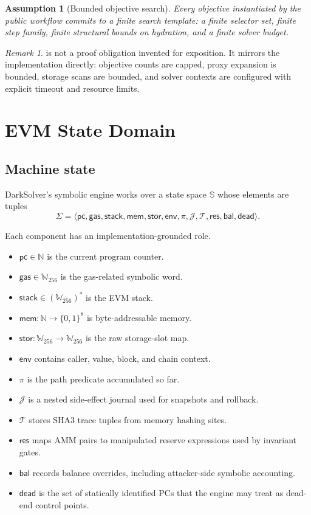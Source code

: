 \documentclass[11pt]{article}
\numberwithin{equation}{section}
\newtheorem{assumption}[definition]{Assumption}
\theoremstyle{remark}
\newtheorem{remark}[definition]{Remark}
\newcommand{\Bits}[1]{\{0,1\}^{#1}}
\newcommand{\Words}[1]{\mathbb{W}_{#1}}
\newcommand{\Naturals}{\mathbb{N}}
\newcommand{\StateSpace}{\mathbb{S}}
\newcommand{\Trace}{\mathcal{T}}
\newcommand{\Journal}{\mathcal{J}}
\newcommand{\Path}{\pi}
\newcommand{\Storage}{\mathsf{stor}}
\newcommand{\Memory}{\mathsf{mem}}
\newcommand{\Stack}{\mathsf{stack}}
\newcommand{\Gas}{\mathsf{gas}}
\newcommand{\PC}{\mathsf{pc}}
\newcommand{\DeadEnds}{\mathsf{dead}}
\newcommand{\Reserves}{\mathsf{res}}
\begin{document}
\begin{assumption}[Bounded objective search]
\label{ass:bounded-search}
Every objective instantiated by the public workflow commits to a finite search template: a finite selector set, finite step family, finite structural bounds on hydration, and a finite solver budget.
\end{assumption}

\begin{remark}
 is not a proof obligation invented for exposition. It mirrors the implementation directly: objective counts are capped, proxy expansion is bounded, storage scans are bounded, and solver contexts are configured with explicit timeout and resource limits.
\end{remark}

\section{EVM State Domain}
\label{sec:state-domain}

\subsection{Machine state}

DarkSolver's symbolic engine works over a state space \(\StateSpace\) whose elements are tuples
\begin{equation}
\label{eq:symbolic-state}
\Sigma
=
\langle
\PC,
\Gas,
\Stack,
\Memory,
\Storage,
\mathsf{env},
\Path,
\Journal,
\Trace,
\Reserves,
\mathsf{bal},
\DeadEnds
\rangle.
\end{equation}

Each component has an implementation-grounded role.
\begin{itemize}[leftmargin=1.5em]
  \item \(\PC \in \Naturals\) is the current program counter.
  \item \(\Gas \in \Words{256}\) is the gas-related symbolic word.
  \item \(\Stack \in (\Words{256})^\ast\) is the EVM stack.
  \item \(\Memory : \Naturals \to \Bits{8}\) is byte-addressable memory.
  \item \(\Storage : \Words{256} \to \Words{256}\) is the raw storage-slot map.
  \item \(\mathsf{env}\) contains caller, value, block, and chain context.
  \item \(\Path\) is the path predicate accumulated so far.
  \item \(\Journal\) is a nested side-effect journal used for snapshots and rollback.
  \item \(\Trace\) stores SHA3 trace tuples from memory hashing sites.
  \item \(\Reserves\) maps AMM pairs to manipulated reserve expressions used by invariant gates.
  \item \(\mathsf{bal}\) records balance overrides, including attacker-side symbolic accounting.
  \item \(\DeadEnds\) is the set of statically identified PCs that the engine may treat as dead-end control points.
\end{itemize}
\end{document}
